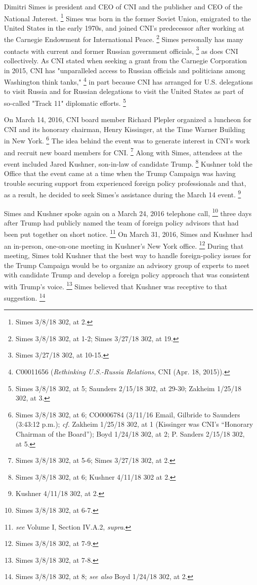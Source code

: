 Dimitri Simes is president and CEO of CNI and the publisher and CEO of the National Jnterest.%
\footnote{Simes 3/8/18 302, at 2.}
Simes was born in the former Soviet Union, emigrated to the United States in the early 1970s, and joined CNI's predecessor after working at the Carnegie Endowment for International Peace.%
\footnote{ Simes 3/8/18 302, at 1-2; 
Simes 3/27/18 302, at 19.}
Simes personally has many contacts with current and former Russian government officials,%
\footnote{Simes 3/27/18 302, at 10-15.}
as does CNI collectively.
As CNI stated when seeking a grant from the Carnegie Corporation in 2015, CNI has "unparalleled access to Russian officials and politicians among Washington think tanks,"%
\footnote{C00011656 (\textit{Rethinking U.S.-Russia Relations}, CNI (Apr. 18, 2015)).}
in part because CNI has arranged for U.S. delegations to visit Russia and for Russian delegations to visit the United States as part of so-called "Track 11" diplomatic efforts.%
\footnote{Simes 3/8/18 302, at 5; 
Saunders 2/15/18 302, at 29-30; 
Zakheim 1/25/18 302, at 3.}

On March 14, 2016, CNI board member Richard Plepler organized a luncheon for CNI and its honorary chairman, Henry Kissinger, at the Time Warner Building in New York.%
\footnote{Simes 3/8/18 302, at 6; 
CO0006784 (3/11/16 Email, Gilbride to Saunders (3:43:12 p.m.); 
\textit{cf.} Zakheim 1/25/18 302, at 1 (Kissinger was CNI’s “Honorary Chairman of the Board”); 
Boyd 1/24/18 302, at 2; 
P. Sanders 2/15/18 302, at 5.}
The idea behind the event was to generate interest in CNI's work and recruit new board members for CNI.%
\footnote{Simes 3/8/18 302, at 5-6; Simes 3/27/18 302, at 2.}
Along with Simes, attendees at the event included Jared Kushner, son-in-law of candidate Trump.%
\footnote{Simes 3/8/18 302, at 6; Kushner 4/11/18 302 at 2.}
Kushner told the Office that the event came at a time when the Trump Campaign was having trouble securing support from experienced foreign policy professionals and that, as a result, he decided to seek Simes's assistance during the March 14 event.%
\footnote{Kushner 4/11/18 302, at 2.}

Simes and Kushner spoke again on a March 24, 2016 telephone call,%
\footnote{Simes 3/8/18 302, at 6-7.}
three days after Trump had publicly named the team of foreign policy advisors that had been put together on short notice.%
\footnote{ \textit{see} Volume I, Section IV.A.2, \textit{supra}.}
On March 31, 2016, Simes and Kushner had an in-person, one-on-one meeting in Kushner's New York office.%
\footnote{Simes 3/8/18 302, at 7-9.}
During that meeting, Simes told Kushner that the best way to handle foreign-policy issues for the Trump Campaign would be to organize an advisory group of experts to meet with candidate Trump and develop a foreign policy approach that was consistent with Trump's voice.%
\footnote{Simes 3/8/18 302, at 7-8.}
Simes believed that Kushner was receptive to that suggestion.%
\footnote{Simes 3/8/18 302, at 8; 
\textit{see also} Boyd 1/24/18 302, at 2.}

